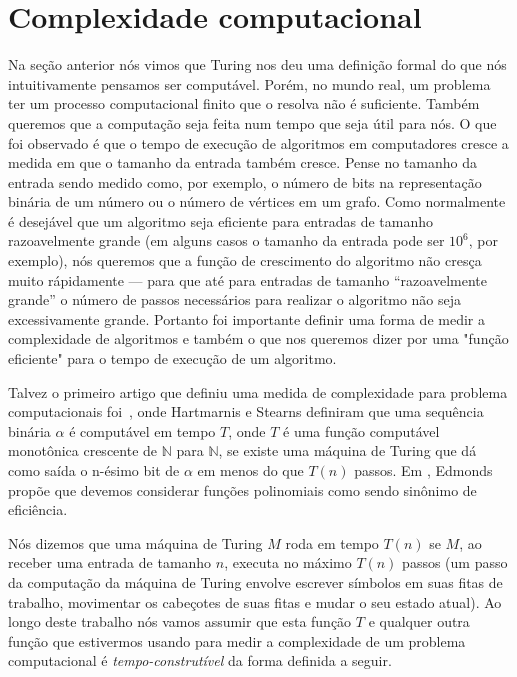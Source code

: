 \section{Complexidade computacional} \label{section_computational_complexity}

Na seção anterior nós vimos que Turing nos deu uma definição formal do que nós intuitivamente pensamos ser computável. Porém, no mundo real, um problema ter um processo computacional finito que o resolva não é suficiente. Também queremos que a computação seja feita num tempo que seja útil para nós. O que foi observado é que o tempo de execução de algoritmos em computadores cresce a medida em que o tamanho da entrada também cresce. Pense no tamanho da entrada sendo medido como, por exemplo, o número de bits na representação binária de um número ou o número de vértices em um grafo. Como normalmente é desejável que um algoritmo seja eficiente para entradas de tamanho razoavelmente grande (em alguns casos o tamanho da entrada pode ser $10^6$, por exemplo), nós queremos que a função de crescimento do algoritmo não cresça muito rápidamente --- para que até para entradas de tamanho ``razoavelmente grande'' o número de passos necessários para realizar o algoritmo não seja excessivamente grande. Portanto foi importante definir uma forma de medir a complexidade de algoritmos e também o que nos queremos dizer por uma "função eficiente" para o tempo de execução de um algoritmo.

Talvez o primeiro artigo que definiu uma medida de complexidade para problema computacionais foi~\cite{hartmanis1965computational}, onde Hartmarnis e Stearns definiram que uma sequência binária $\alpha$ é computável em tempo $T$, onde $T$ é uma função computável monotônica crescente de $\mathbb{N}$ para $\mathbb{N}$, se existe uma máquina de Turing que dá como saída o n-ésimo bit de $\alpha$ em menos do que $T(n)$ passos. Em \cite{edmonds1965paths}, Edmonds propõe que devemos considerar funções polinomiais como sendo sinônimo de eficiência.

Nós dizemos que uma máquina de Turing $M$ roda em tempo $T(n)$ se $M$, ao receber uma entrada de tamanho $n$, executa no máximo $T(n)$ passos (um passo da computação da máquina de Turing envolve escrever símbolos em suas fitas de trabalho, movimentar os cabeçotes de suas fitas e mudar o seu estado atual). Ao longo deste trabalho nós vamos assumir que esta função $T$ e qualquer outra função que estivermos usando para medir a complexidade de um problema computacional é \emph{tempo-construtível} da forma definida a seguir.

